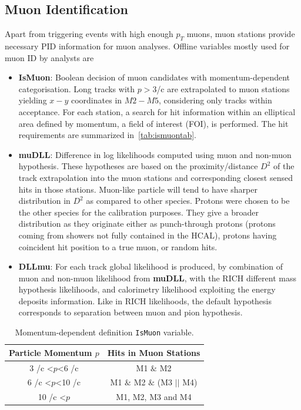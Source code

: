 \subsection{Muon Identification }
\label{muonID}
Apart from triggering events with high enough $p_{T}$ muons, muon stations provide necessary PID information for muon analyses. Offline variables mostly used for muon ID by analysts are
\begin{itemize}
	\item{\textbf{IsMuon}: Boolean decision of muon candidates with momentum-dependent categorisation. Long tracks with $p>3$\gev/c are extrapolated to muon stations yielding $x-y$ coordinates in $M2-M5$, considering only tracks within acceptance. For each station, a search for hit information within an elliptical area defined by momentum, a field of interest (\Gls{FOI}), is performed. The hit requirements are summarized in~\autoref{tab:ismuontab}.}
	\item{\textbf{muDLL}: Difference in log likelihoods computed using muon and non-muon hypothesis. These hypotheses are based on the proximity/distance $D^{2}$ of the track extrapolation into the muon stations and corresponding closest sensed hits in those stations. Muon-like particle will tend to have sharper distribution in $D^{2}$ as compared to other species. Protons were chosen to be the other species for the calibration purposes. They give a broader distribution as they originate either as punch-through protons (protons coming from showers not fully contained in the \gls{HCAL}), protons having coincident hit position to a true muon, or random hits.}
	\item{\textbf{DLLmu}}:  For each track global likelihood is produced, by combination of muon and non-muon likelihood from \textbf{muDLL}, with the \Gls{RICH} different mass hypothesis likelihoods, and calorimetry likelihood exploiting the energy deposits information. Like in \Gls{RICH} likelihoods, the default hypothesis corresponds to separation between muon and pion hypothesis.    

\end{itemize}


\begin{table}[!h]
	\centering
	\hspace*{-0.8cm}
	\begin{tabular}{c c}
		\toprule
		Particle Momentum $p$  & Hits in Muon Stations \\ \hline
		3 \gev/c <$p$<6 \gev/c & M1 $\&$ M2\\
		6 \gev/c <$p$<10 \gev/c & M1 $\&$ M2 $\&$ (M3 $||$ M4) \\
		10 \gev/c <$p$ & M1, M2, M3 and M4 \\ \bottomrule      
	\end{tabular}
	\caption{Momentum-dependent definition \texttt{IsMuon} variable.}
	\label{tab:ismuontab}
\end{table}   

